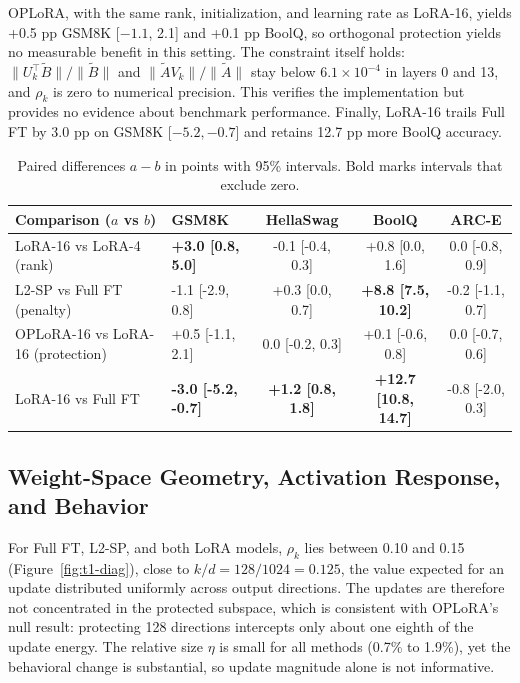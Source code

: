 \documentclass{article}
\begin{document}
OPLoRA, with the same rank, initialization, and learning rate as LoRA-16, yields +0.5 pp GSM8K [$-1.1$, 2.1] and +0.1 pp BoolQ, so orthogonal protection yields no measurable benefit in this setting. The constraint itself holds: $\|U_k^\top \tilde B\|/\|\tilde B\|$ and $\|\tilde A V_k\|/\|\tilde A\|$ stay below $6.1\times10^{-4}$ in layers 0 and 13, and $\rho_k$ is zero to numerical precision. This verifies the implementation but provides no evidence about benchmark performance. Finally, LoRA-16 trails Full FT by 3.0 pp on GSM8K [$-5.2,-0.7$] and retains 12.7 pp more BoolQ accuracy.

\begin{table}[t]
\centering
\caption{Paired differences $a-b$ in points with 95\% intervals. Bold marks intervals that exclude zero.}
\label{tab:t1-ctrl}
\footnotesize
\begin{tabular}{llccc}
\toprule
Comparison ($a$ vs $b$) & GSM8K & HellaSwag & BoolQ & ARC-E \\
\midrule
LoRA-16 vs LoRA-4 (rank) & \textbf{+3.0 [0.8, 5.0]} & -0.1 [-0.4, 0.3] & +0.8 [0.0, 1.6] & 0.0 [-0.8, 0.9] \\
L2-SP vs Full FT (penalty) & -1.1 [-2.9, 0.8] & +0.3 [0.0, 0.7] & \textbf{+8.8 [7.5, 10.2]} & -0.2 [-1.1, 0.7] \\
OPLoRA-16 vs LoRA-16 (protection) & +0.5 [-1.1, 2.1] & 0.0 [-0.2, 0.3] & +0.1 [-0.6, 0.8] & 0.0 [-0.7, 0.6] \\
LoRA-16 vs Full FT & \textbf{-3.0 [-5.2, -0.7]} & \textbf{+1.2 [0.8, 1.8]} & \textbf{+12.7 [10.8, 14.7]} & -0.8 [-2.0, 0.3] \\
\bottomrule
\end{tabular}
\end{table}

\subsection{Weight-Space Geometry, Activation Response, and Behavior}
For Full FT, L2-SP, and both LoRA models, $\rho_k$ lies between 0.10 and 0.15 (Figure~\ref{fig:t1-diag}), close to $k/d=128/1024=0.125$, the value expected for an update distributed uniformly across output directions. The updates are therefore not concentrated in the protected subspace, which is consistent with OPLoRA's null result: protecting 128 directions intercepts only about one eighth of the update energy. The relative size $\eta$ is small for all methods (0.7\% to 1.9\%), yet the behavioral change is substantial, so update magnitude alone is not informative.
\end{document}
